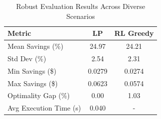 \begin{table}[h]
\centering
\caption{Robust Evaluation Results Across Diverse Scenarios}
\label{tab:robust_eval}
\begin{tabular}{lcc}
\hline
\textbf{Metric} & \textbf{LP} & \textbf{RL Greedy} \\
\hline
Mean Savings (\%) & 24.97 & 24.21 \\
Std Dev (\%) & 2.54 & 2.31 \\
Min Savings (\$) & 0.0279 & 0.0274 \\
Max Savings (\$) & 0.0623 & 0.0574 \\
Optimality Gap (\%) & 0.00 & 1.03 \\
Avg Execution Time (s) & 0.040 & - \\
\hline
\end{tabular}
\end{table}

